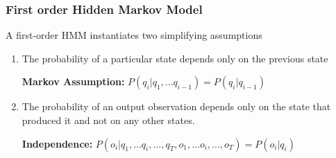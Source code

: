 \documentclass[13.5pt,aspecratio=169]{beamer}
\begin{document}
\begin{frame}
    \onehalfspacing
        \frametitle{First order Hidden Markov Model}
        \begin{block}{A first-order HMM instantiates two simplifying assumptions}
            \begin{enumerate}
                \item The probability of a particular state depends
                only on the previous state
                \begin{center}
                    \textbf{Markov Assumption:} \hspace{0.5em} $P(q_i | q_1,...q_{i-1}) = P(q_i | q_{i-1})$
                \end{center}
                \item The probability of an output observation depends only on the state that
                produced it and not on any other states.
                \begin{center}
                    \textbf{Independence:} $P(o_i | q_1,...q_i,...,q_T, o_1,...o_i,...,o_T) = P(o_i | q_i)$
                \end{center}
            \end{enumerate}
        \end{block}
        
    \end{frame}
\end{document}
